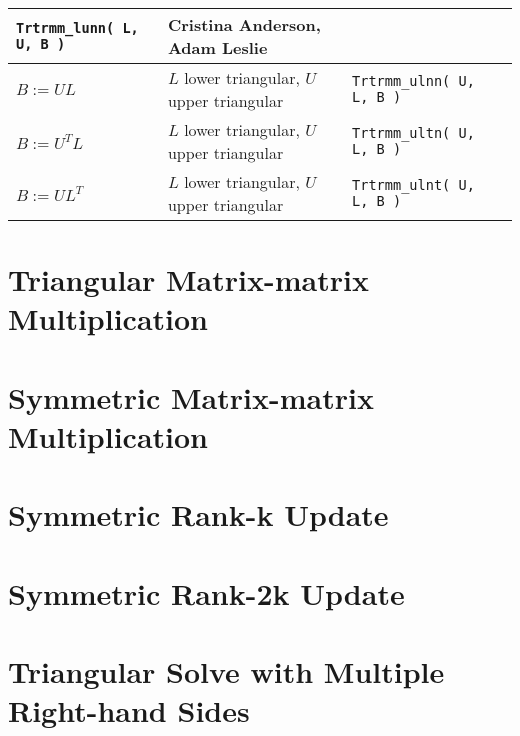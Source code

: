 \documentclass[twoside,openright,12pt]{book}
\begin{document}
\begin{sidewaysfigure}
\begin{center}
\begin{tabular}{| l | p{2in}| l | p{4in} |}
			{\tt Trtrmm\_lunn( L, U, B )} &  Cristina Anderson, Adam Leslie
			\\ \hline
			$ B := U L $ & $ L $ lower triangular, $ U $ upper triangular &
			{\tt Trtrmm\_ulnn( U, L, B )} &
			\\ \hline
			$ B := U^T L $ & $ L $ lower triangular, $ U $ upper triangular &
			{\tt Trtrmm\_ultn( U, L, B )} &
			\\ \hline
			$ B := U L^T $ & $ L $ lower triangular, $ U $ upper triangular &
			{\tt Trtrmm\_ulnt( U, L, B )} &
			\\ \hline
		\end{tabular}
	\end{center}
\end{sidewaysfigure}

\part{Triangular Matrix-matrix Multiplication}





\part{Symmetric Matrix-matrix Multiplication}



\part{Symmetric Rank-k Update}



\part{Symmetric Rank-2k Update}



\part{Triangular Solve with Multiple Right-hand Sides}


\end{document}

